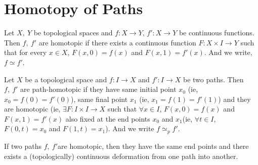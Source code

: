 
\section{Homotopy of Paths}
\begin{definition}
	Let $X,\ Y$ be topological spaces and $f : X \to Y$, $f':X \to Y$ be continuous functions.
	Then $f,\ f'$ are homotopic if there exists a continuous function $F : X \times I \to Y$ such that for every $x \in X$, $F(x,0) = f(x)$ and $F(x,1) = f'(x)$.
	And we write, $f \simeq f'$.
\end{definition}

\begin{definition}
	Let $X$ be a topological space and $f : I \to X$ and $f' : I \to X$ be two paths.
	Then $f,\ f'$ are path-homotopic if they have same initial point $x_0$ (ie, $x_0=f(0)=f'(0)$), same final point $x_1$ (ie, $x_1=f(1)=f'(1)$) and they are homotopic (ie, $\exists F: I \times I \to X$ such that $\forall x \in I$, $F(x,0)=f(x)$ and $F(x,1)=f'(x)$ also fixed at the end points $x_0$ and $x_1$(ie, $\forall t \in I$, $F(0,t) = x_0$ and $F(1,t) = x_1$).
	And we write $f \simeq_p f'$.
\end{definition}

\begin{remark}
	If two paths $f,\ f'$are homotopic, then they have the same end points and there exists a (topologically) continuous deformation from one path into another.
\end{remark}

